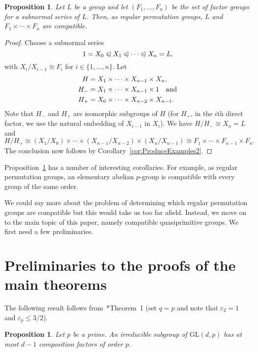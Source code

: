 \documentclass[twoside,12pt,leqno]{amsproc}
\numberwithin{table}{section}
\numberwithin{figure}{section}
\theoremstyle{plain}
\newtheorem{proposition}[theorem]{Proposition}
\theoremstyle{definition}\newtheorem{definition}[theorem]{Definition}
\theoremstyle{definition}\newtheorem{example}[theorem]{Example}
\theoremstyle{definition}\newtheorem{construction}[theorem]{Construction}
\theoremstyle{definition}\newtheorem{remark}[theorem]{Remark}
\theoremstyle{definition}\newtheorem{problem}[theorem]{Problem}
\begin{document}
\begin{proposition}\label{coolcoolProp}
Let $L$ be a group and let $(F_1,\ldots,F_n)$ be the set of factor groups for a subnormal series of $L$. Then, as regular permutation groups, $L$ and $F_1\times\cdots\times F_n$ are compatible.
\end{proposition}
\begin{proof}
Choose a subnormal series 
$$1=X_0\trianglelefteqslant X_1\trianglelefteqslant\cdots\trianglelefteqslant X_n=L,$$ 
with $X_i/X_{i-1}\cong F_i$ for $i\in\{1,\ldots,n\}$. Let 
\begin{align*}
H&=X_1\times \cdots\times X_{n-1}\times X_n,\\
H_-&= X_1\times\cdots\times X_{n-1}\times 1\quad\textup{and}\\
H_+&=X_0\times\cdots \times X_{n-2}\times X_{n-1}.
\end{align*}
Note that $H_-$ and $H_+$ are isomorphic subgroups of $H$ (for $H_+$, in the $i$th direct factor, we use the natural embedding of $X_{i-1}$ in $X_i$).  We have $H/H_-\cong X_n=L$ and 
$$H/H_+\cong (X_1/X_0)\times\cdots\times(X_{n-1}/X_{n-2})\times(X_{n}/X_{n-1})\cong F_1\times\cdots \times F_{n-1}\times F_n.$$
The conclusion now follows by Corollary~\ref{cor:ProduceExamples2}.
\end{proof}

Proposition~\ref{coolcoolProp} has a number of interesting corollaries. For example, as regular permutation groups, an elementary abelian $p$-group is compatible with every group of the same order. 

We could say more about the problem of  determining which regular permutation groups are compatible but this would take us too far afield. Instead, we move on to the main topic of this paper, namely compatible quasiprimitive groups. We first need a few preliminaries.

\section{Preliminaries to the proofs of the main theorems}\label{sec:qp}

The following result follows from~\cite{CompFactors}*{Theorem~1} (set $q=p$ and note that ${\varepsilon}_2=1$ and ${\varepsilon}_p{\leqslant}3/2$).  

\begin{proposition}\label{compfactors}
Let $p$ be a prime. An irreducible subgroup of ${\mathrm{GL}}(d,p)$ has at most $d-1$ composition factors of order $p$.
\end{proposition}
\end{document}
